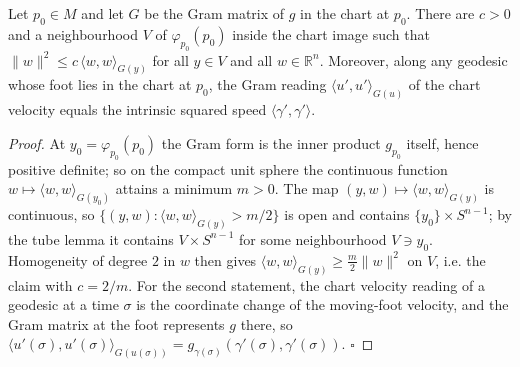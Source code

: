 \begin{lemma}
  \label{lem:dc-ch7-2-8-gram-bound}
  \leanok
  Let $p_0\in M$ and let $G$ be the Gram matrix of $g$ in the chart at $p_0$.
  There are $c>0$ and a neighbourhood $V$ of $\varphi_{p_0}(p_0)$ inside the chart
  image such that $\|w\|^2\le c\,\langle w,w\rangle_{G(y)}$ for all $y\in V$ and
  all $w\in\mathbb R^n$. Moreover, along any geodesic whose foot lies in the chart
  at $p_0$, the Gram reading $\langle u',u'\rangle_{G(u)}$ of the chart velocity
  equals the intrinsic squared speed $\langle\gamma',\gamma'\rangle$.
\end{lemma}
\begin{proof}
  \leanok
  At $y_0=\varphi_{p_0}(p_0)$ the Gram form is the inner product $g_{p_0}$ itself,
  hence positive definite; so on the compact unit sphere the continuous function
  $w\mapsto\langle w,w\rangle_{G(y_0)}$ attains a minimum $m>0$. The map
  $(y,w)\mapsto\langle w,w\rangle_{G(y)}$ is continuous, so
  $\{(y,w):\langle w,w\rangle_{G(y)}>m/2\}$ is open and contains
  $\{y_0\}\times S^{n-1}$; by the tube lemma it contains $V\times S^{n-1}$ for
  some neighbourhood $V\ni y_0$. Homogeneity of degree $2$ in $w$ then gives
  $\langle w,w\rangle_{G(y)}\ge\tfrac m2\|w\|^2$ on $V$, i.e. the claim with
  $c=2/m$. For the second statement, the chart velocity reading of a geodesic at
  a time $\sigma$ is the coordinate change of the moving-foot velocity, and the
  Gram matrix at the foot represents $g$ there, so
  $\langle u'(\sigma),u'(\sigma)\rangle_{G(u(\sigma))}
   =g_{\gamma(\sigma)}(\gamma'(\sigma),\gamma'(\sigma))$. $\square$
\end{proof}

